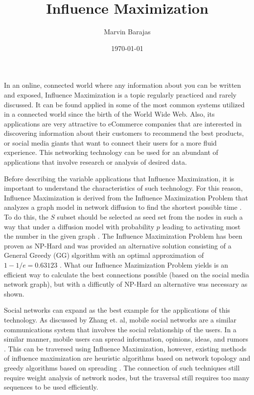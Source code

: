 \documentclass[12pt]{article}
\title{Influence Maximization}
\author{Marvin Barajas}
\date{\today}				%
\begin{document}
\onehalfspacing				%
\maketitle				%
\pagebreak
In an online, connected world where any information about you can be written and exposed, Influence Maximization is a topic regularly practiced and rarely discussed. 
It can be found applied in some of the most common systems utilized in a connected world since the birth of the World Wide Web. 
Also, its applications are very attractive to eCommerce companies that are interested in discovering information about their customers to recommend the best products, or social media giants that want to connect their users for a more fluid experience. 
This networking technology can be used for an abundant of applications that involve research or analysis of desired data. 

Before describing the variable applications that Influence Maximization, it is important to understand the characteristics of such technology. 
For this reason, Influence Maximization is derived from the Influence Maximization Problem that analyzes a graph model in network diffusion to find the shortest possible time \cite{9721514}. 
To do this, the $S$ subset should be selected as seed set from the nodes in such a way that under a diffusion model with probability $p$ leading to activating most the number in the given graph \cite{9721514}. 
The Influence Maximization Problem has been proven as NP-Hard and was provided an alternative solution consisting of a  General Greedy (GG) slgorithm with an optimal approximation of $1-1/e=0.63123$ \cite{9721514}. 
What our Influence Mazimization Problem yields is an efficient way to calculate the best connections possible (based on the social media network graph), but with a difficutly of NP-Hard an alternative was necessary as shown. 

Social networks can expand as the best example for the applications of this technology. As discussed by Zhang et. al, mobile social networks are a similar communications system that involves the social relationship of the users. 
In a similar manner, mobile users can spread information, opinions, ideas, and rumors \cite{9744500}. 
This can be traversed using Influence Maximization, however, existing methods of influence maximization are heuristic algorithms based on network topology and greedy algorithms based on spreading \cite{9744500}. 
The connection of such techniques still require weight analysis of network nodes, but the traversal still requires too many sequences to be used efficiently.
\end{document}

